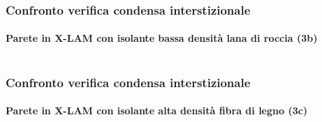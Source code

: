 \documentclass[aspectratio=141,10pt]{beamer}
\begin{document}
\begin{frame}
    \frametitle{Confronto verifica condensa interstizionale}
    \framesubtitle{Parete in X-LAM con isolante bassa densità lana di roccia (3b)}
    \begin{columns}
        \begin{column}{0.45\textwidth}
            \resizebox{\textwidth}{!}{%
            
            }
        \end{column}
        \begin{column}{0.55\textwidth}
            \scriptsize
            
        \end{column}
    \end{columns}
\end{frame}
\begin{frame}
    \frametitle{Confronto verifica condensa interstizionale}
    \framesubtitle{Parete in X-LAM con isolante alta densità fibra di legno (3c)}
    \begin{columns}
        \begin{column}{0.45\textwidth}
            \resizebox{\textwidth}{!}{%
            
            }
        \end{column}
        \begin{column}{0.55\textwidth}
            \scriptsize
            
        \end{column}
    \end{columns}
\end{frame}
\end{document}
